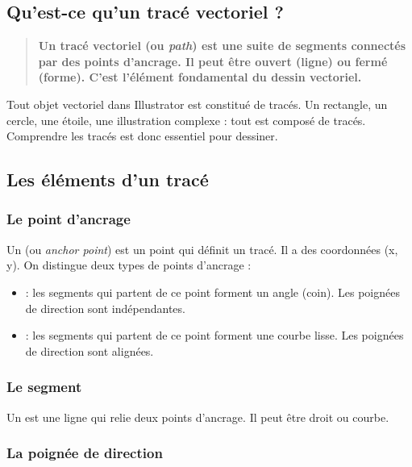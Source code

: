 \subsection{Qu'est-ce qu'un tracé vectoriel ?}

\begin{quote}
\textbf{Un tracé vectoriel (ou \emph{path}) est une suite de segments connectés par des points d'ancrage. Il peut être ouvert (ligne) ou fermé (forme). C'est l'élément fondamental du dessin vectoriel.}
\end{quote}

Tout objet vectoriel dans Illustrator est constitué de tracés. Un rectangle, un cercle, une étoile, une illustration complexe : tout est composé de tracés. Comprendre les tracés est donc essentiel pour dessiner.

\subsection{Les éléments d'un tracé}

\subsubsection{Le point d'ancrage}

Un  (ou \emph{anchor point}) est un point qui définit un tracé. Il a des coordonnées (x, y). On distingue deux types de points d'ancrage :

\begin{itemize}
    \item {} : les segments qui partent de ce point forment un angle (coin). Les poignées de direction sont indépendantes.
    \item {} : les segments qui partent de ce point forment une courbe lisse. Les poignées de direction sont alignées.
\end{itemize}

\subsubsection{Le segment}

Un  est une ligne qui relie deux points d'ancrage. Il peut être droit ou courbe.

\subsubsection{La poignée de direction}


